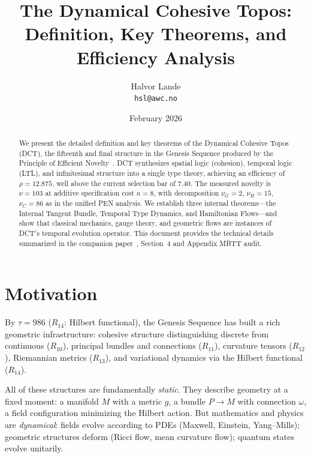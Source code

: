 \documentclass[11pt,a4paper]{article}
\title{\textbf{The Dynamical Cohesive Topos:\\
Definition, Key Theorems, and Efficiency Analysis}}
\author{Halvor Lande\\
\texttt{hsl@awc.no}}
\date{February 2026}
\theoremstyle{plain}
\theoremstyle{definition}
\theoremstyle{remark}
\begin{document}
\maketitle

\begin{abstract}
We present the detailed definition and key theorems of the Dynamical Cohesive Topos (DCT), the fifteenth and final structure in the Genesis Sequence produced by the Principle of Efficient Novelty~\cite{pen-unified}.
DCT synthesizes spatial logic (cohesion), temporal logic (LTL), and infinitesimal structure into a single type theory, achieving an efficiency of $\rho = 12.875$, well above the current selection bar of $7.40$.
The measured novelty is $\nu = 103$ at additive specification cost $\kappa = 8$, with decomposition $\nu_G=2$, $\nu_H=15$, $\nu_C=86$ as in the unified PEN analysis.
We establish three internal theorems---the Internal Tangent Bundle, Temporal Type Dynamics, and Hamiltonian Flows---and show that classical mechanics, gauge theory, and geometric flows are instances of DCT's temporal evolution operator.
This document provides the technical details summarized in the companion paper~\cite{pen-unified}, Section~4 and Appendix MBTT audit.
\end{abstract}

\tableofcontents

\section{Motivation}
\label{sec:motivation}

By $\tau = 986$ ($R_{14}$: Hilbert functional), the Genesis Sequence has built a rich geometric infrastructure:
cohesive structure distinguishing discrete from continuous ($R_{10}$),
principal bundles and connections ($R_{11}$),
curvature tensors ($R_{12}$),
Riemannian metrics ($R_{13}$),
and variational dynamics via the Hilbert functional ($R_{14}$).

All of these structures are fundamentally \emph{static}.
They describe geometry at a fixed moment: a manifold $M$ with a metric $g$, a bundle $P \to M$ with connection $\omega$, a field configuration minimizing the Hilbert action.
But mathematics and physics are \emph{dynamical}: fields evolve according to PDEs (Maxwell, Einstein, Yang--Mills); geometric structures deform (Ricci flow, mean curvature flow); quantum states evolve unitarily.
\end{document}
